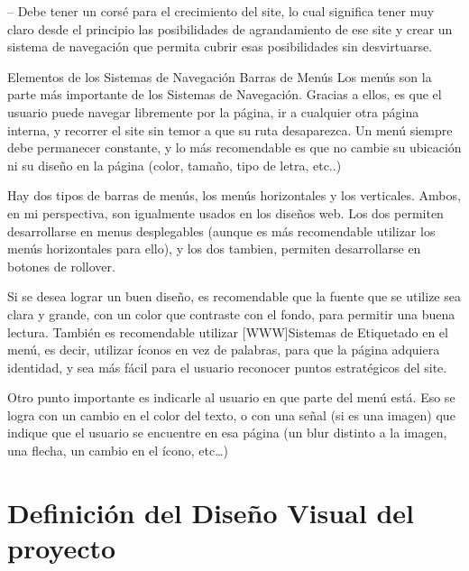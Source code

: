 – Debe tener un corsé para el crecimiento del site, lo cual significa tener muy claro desde el principio las posibilidades de agrandamiento de ese site y crear un sistema de navegación que permita cubrir esas posibilidades sin desvirtuarse.

Elementos de los Sistemas de Navegación
Barras de Menús
Los menús son la parte más importante de los Sistemas de Navegación. Gracias a ellos, es que el usuario puede navegar libremente por la página, ir a cualquier otra página interna, y recorrer el site sin temor a que su ruta desaparezca. Un menú siempre debe permanecer constante, y lo más recomendable es que no cambie su ubicación ni su diseño en la página (color, tamaño, tipo de letra, etc..)

Hay dos tipos de barras de menús, los menús horizontales y los verticales. Ambos, en mi perspectiva, son igualmente usados en los diseños web. Los dos permiten desarrollarse en menus desplegables (aunque es más recomendable utilizar los menús horizontales para ello), y los dos tambien, permiten desarrollarse en botones de rollover.

Si se desea lograr un buen diseño, es recomendable que la fuente que se utilize sea clara y grande, con un color que contraste con el fondo, para permitir una buena lectura. También es recomendable utilizar [WWW]Sistemas de Etiquetado en el menú, es decir, utilizar íconos en vez de palabras, para que la página adquiera identidad, y sea más fácil para el usuario reconocer puntos estratégicos del site.

Otro punto importante es indicarle al usuario en que parte del menú está. Eso se logra con un cambio en el color del texto, o con una señal (si es una imagen) que indique que el usuario se encuentre en esa página (un blur distinto a la imagen, una flecha, un cambio en el ícono, etc…)
\section{Definición del Diseño Visual del proyecto}
